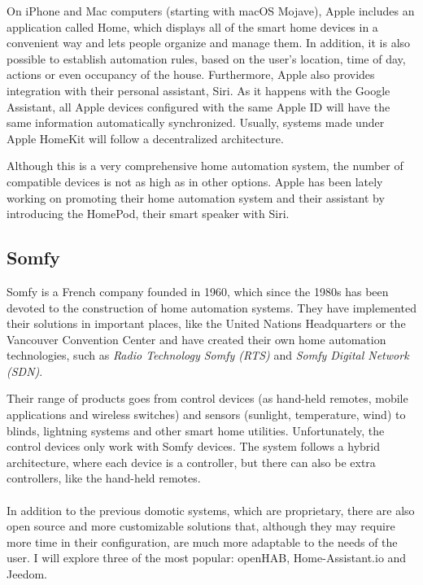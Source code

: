 On iPhone and Mac computers (starting with macOS Mojave), Apple includes an application called Home, which displays all 
of the smart home devices in a convenient way and lets people organize and manage them. In addition, it is also possible to establish 
automation rules, based on the user's location, time of day, actions or even occupancy of the house. Furthermore, Apple also provides
integration with their personal assistant, Siri. As it happens with the Google Assistant, all Apple devices configured with the same Apple 
ID will have the same information automatically synchronized.\cite{appleIOSHome} Usually, systems made under Apple HomeKit will follow
a decentralized architecture.

Although this is a very comprehensive home automation system, the number of compatible devices is not as high as in other options. 
Apple has been lately working on promoting their home automation system and their assistant by introducing the HomePod, their smart
speaker with Siri.

\subsection{Somfy}
Somfy is a French company founded in 1960, which since the 1980s has been devoted to the construction of home automation systems.
They have implemented their solutions in important places, like the United Nations Headquarters or the Vancouver Convention Center 
and have created their own home automation technologies, such as \textit{Radio Technology Somfy (RTS)} and \textit{Somfy Digital 
Network (SDN)}.\cite{somfyOurStory}

Their range of products goes from control devices (as hand-held remotes, mobile applications and wireless switches) and sensors (sunlight,
temperature, wind) to blinds, lightning systems and other smart home utilities. Unfortunately, the control devices only work with Somfy 
devices. The system follows a hybrid architecture, where each device is a controller, but there can also be extra controllers, like the 
hand-held remotes.\\~\\

In addition to the previous domotic systems, which are proprietary, there are also open source and more customizable solutions that, 
although they may require more time in their configuration, are much more adaptable to the needs of the user. I will explore three of
the most popular: openHAB, Home-Assistant.io and Jeedom.

